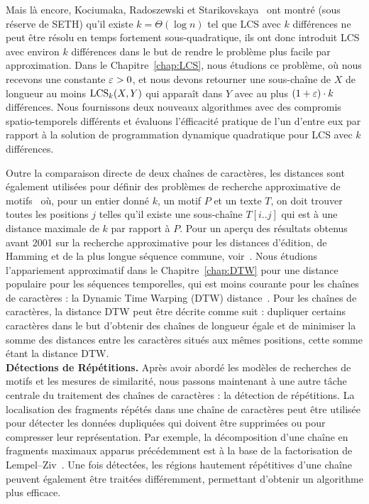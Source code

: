 Mais là encore, Kociumaka, Radoszewski et Starikovskaya~\cite{DBLP:journals/algorithmica/KociumakaRS19} ont montré (sous réserve de SETH) qu'il existe $k=\Theta(\log n)$ tel que LCS avec $k$ différences ne peut être résolu en temps fortement sous-quadratique, ils ont donc introduit LCS avec environ $k$ différences dans le but de rendre le problème plus facile par approximation.
Dans le Chapitre~\ref{chap:LCS}, nous étudions ce problème, où nous recevons une constante $\varepsilon > 0$, et nous devons retourner une sous-chaîne de $X$ de longueur au moins $\mathrm{LCS}_{k}(X,Y)$ qui apparaît dans $Y$ avec au plus $(1+\varepsilon) \cdot k$ différences. Nous fournissons deux nouveaux algorithmes avec des compromis spatio-temporels différents et évaluons l'éfficacité pratique de l'un d'entre eux par rapport à la solution de programmation dynamique quadratique pour LCS avec $k$ différences.


Outre la comparaison directe de deux chaînes de caractères, les distances sont également utilisées pour définir des problèmes de recherche approximative de motifs~\cite{landau1986efficient,landau1989fast} où, pour un entier donné $k$, un motif $P$ et un texte $T$, on doit trouver toutes les positions $j$ telles qu'il existe une sous-chaîne $T[i..j]$ qui est à une distance maximale de $k$ par rapport à $P$.
Pour un aperçu des résultats obtenus avant 2001 sur la recherche approximative pour les distances d'édition, de Hamming et de la plus longue séquence commune, voir~\cite{navarro2001guided}.
Nous étudions l'appariement approximatif dans le Chapitre~\ref{chap:DTW} pour une distance populaire pour les séquences temporelles, qui est moins courante pour les chaînes de caractères : la \og{}Dynamic Time Warping (DTW) distance\fg{}~\cite{sakoe1978dynamic}. Pour les chaînes de caractères, la distance DTW peut être décrite comme suit : dupliquer certains caractères dans le but d'obtenir des chaînes de longueur égale et de minimiser la somme des distances entre les caractères situés aux mêmes positions, cette somme étant la distance DTW. 
\\


\noindent\textbf{Détections de Répétitions.} Après avoir abordé les modèles de recherches de motifs et les mesures de similarité, nous passons maintenant à une autre tâche centrale du traitement des chaînes de caractères : la détection de répétitions. La localisation des fragments répétés dans une chaîne de caractères peut être utilisée pour détecter les données dupliquées qui doivent être supprimées ou pour compresser leur représentation. Par exemple, la décomposition d'une chaîne en fragments maximaux apparus précédemment est à la base de la factorisation de Lempel--Ziv~\cite{ziv1977universal}. Une fois détectées, les régions hautement répétitives d'une chaîne peuvent également être traitées différemment, permettant d'obtenir un algorithme plus efficace.

